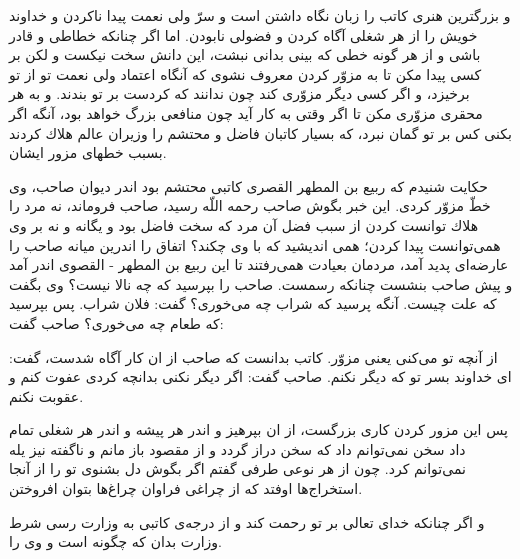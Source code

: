 و بزرگترين هنرى كاتب را زبان نگاه داشتن است و سرّ ولى نعمت پيدا ناكردن و خداوند خويش را از هر شغلى آگاه كردن و فضولى نابودن. اما اگر چنانكه خطاطى و قادر باشى و از هر گونه خطى كه بينى بدانى نبشت، اين دانش سخت نيكست و لكن بر كسى پيدا مكن تا به مزوّر كردن معروف نشوى كه آنگاه اعتماد ولى نعمت تو از تو برخيزد، و اگر كسى ديگر مزوّرى كند چون ندانند كه كردست بر تو بندند. و به هر محقرى مزوّرى مكن تا اگر وقتى به كار آيد چون منافعى بزرگ خواهد بود، آنگه اگر بكنى كس بر تو گمان نبرد، كه بسيار كاتبان فاضل و محتشم را وزيران عالم هلاك كردند بسبب خطهاى مزور ايشان.

حكايت شنيدم كه ربيع بن المطهر القصرى كاتبى محتشم بود اندر ديوان صاحب، وى خطّ مزوّر كردى. اين خبر بگوش صاحب رحمه اللّه رسيد، صاحب فروماند، نه مرد را هلاك توانست كردن از سبب فضل آن مرد كه سخت فاضل بود و يگانه و نه بر وى همى‌توانست پيدا كردن؛ همى انديشيد كه با وى چكند؟ اتفاق را اندرين ميانه صاحب را عارضه‌اى پديد آمد، مردمان بعيادت همى‌رفتند تا اين ربيع بن المطهر - القصوى اندر آمد و پيش صاحب بنشست چنانكه رسمست. صاحب را بپرسيد  كه چه نالا نيست‌؟ وى بگفت كه علت چيست. آنگه پرسيد كه شراب چه مى‌خورى‌؟ گفت: فلان شراب. پس بپرسيد كه طعام چه مى‌خورى‌؟ صاحب گفت:

از آنچه تو مى‌كنى يعنى مزوّر. كاتب بدانست كه صاحب از ان كار آگاه شدست، گفت: اى خداوند بسر تو كه ديگر نكنم. صاحب گفت: اگر ديگر نكنى بدانچه كردى عفوت كنم و عقوبت نكنم.

پس اين مزور كردن كارى بزرگست، از ان بپرهيز و اندر هر پيشه و اندر هر شغلى تمام داد سخن نمى‌توانم داد كه سخن دراز گردد و از مقصود باز مانم و ناگفته نيز يله نمى‌توانم كرد. چون از هر نوعى طرفى گفتم اگر بگوش دل بشنوى تو را از آنجا استخراج‌ها اوفتد كه از چراغى فراوان چراغ‌ها بتوان افروختن.

و اگر چنانكه خداى تعالى بر تو رحمت كند و از درجه‌ی كاتبى به وزارت رسى شرط وزارت بدان كه چگونه است و وى را. 






















































